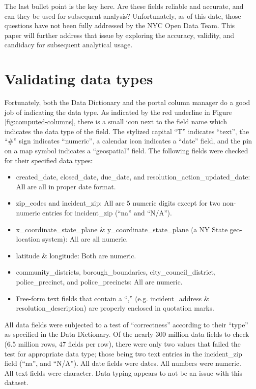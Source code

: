 \documentclass[12pt, titlepage]{article}
\begin{document}
The last bullet point is the key here. Are these fields reliable and accurate, 
and can they be used for subsequent analysis? Unfortunately,
as of this date, those questions have not been fully addressed by the 
NYC Open Data Team. This paper will further address that issue by
exploring the accuracy, validity, and candidacy for subsequent analytical usage.
	
	
	
\section{Validating data types}\label{sec:datatypes}
Fortunately, both the Data Dictionary and the portal column manager 
do a good job of indicating the data type. As indicated by 
the red underline in Figure \ref{fig:computed-columns}, there 
is a small icon next to the field name which indicates the 
data type of the field. The stylized capital ``T'' indicates ``text'', the ``\#'' sign indicates 
``numeric'', a calendar icon indicates a ``date'' field, and the pin on a 
map symbol indicates a ``geospatial'' field. The following fields were 
checked for their specified data types:
	
\begin{itemize}
	\item created\_date, closed\_date, due\_date, and resolution\_action\_updated\_date: 
	All are all in proper date format.
	\item zip\_codes and incident\_zip: All are 5 numeric digits except 
	for two non-numeric entries for incident\_zip (``na'' and ``N/A'').
	\item x\_coordinate\_state\_plane \&  y\_coordinate\_state\_plane 
	(a NY State geo-location system): All are all numeric.
	\item latitude \& longitude: Both are numeric.
	\item community\_districts, borough\_boundaries, 
	city\_council\_district, police\_precinct, and police\_precincts: All are numeric.
	\item Free-form text fields that contain a ``,'' (e.g. incident\_address 
	\& resolution\_description) are properly enclosed in quotation marks.
\end{itemize}	

All data fields were subjected to a test of ``correctness'' 
according to their ``type'' as specified
in the Data Dictionary. Of the nearly 300 million data fields to check 
(6.5 million rows, 47 fields per row), there were only two values that failed 
the test for appropriate data type; those being two text entries in the 
incident\_zip field (``na'', and ``N/A''). All date fields were dates. 
All numbers were numeric. All text fields were character. 
Data typing appears to not be an issue with this dataset.
\end{document}
